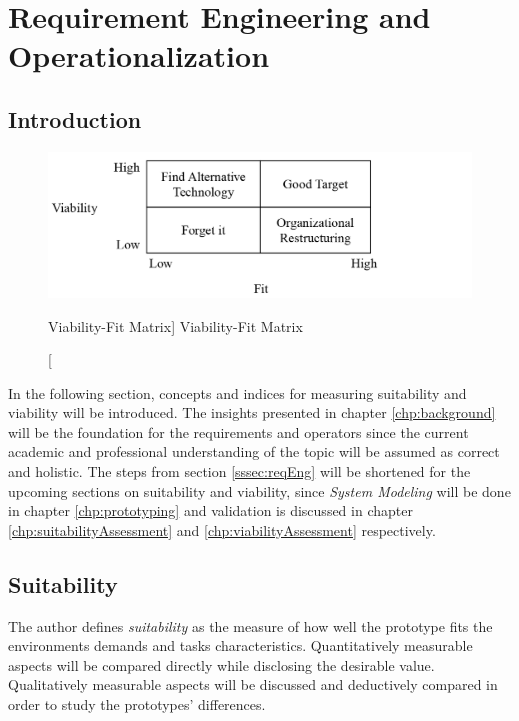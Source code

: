 
\chapter{Requirement Engineering and Operationalization}\label{chp:operationalization}

\section{Introduction}

\begin{figure}[ht]
    \includegraphics[width=\linewidth]{images/methodology/viabFit.PNG}\centering
    \caption
    [Viability-Fit Matrix]
    {Viability-Fit Matrix \cite{Liang2004IntroductionApplications}}
\end{figure}

In the following section, concepts and indices for measuring suitability and viability will be introduced. The insights presented in chapter \ref{chp:background} will be the foundation for the requirements and operators since the current academic and professional understanding of the topic will be assumed as correct and holistic. The steps from section \ref{sssec:reqEng} will be shortened for the upcoming sections on suitability and viability, since \textit{System Modeling} will be done in chapter \ref{chp:prototyping} and validation is discussed in chapter \ref{chp:suitabilityAssessment} and \ref{chp:viabilityAssessment} respectively.  

\section{Suitability}

The author defines \textit{suitability} as the measure of how well the prototype fits the environments demands and tasks characteristics. Quantitatively measurable aspects will be compared directly while disclosing the desirable value. Qualitatively measurable aspects will be discussed and deductively compared in order to study the prototypes' differences. 

